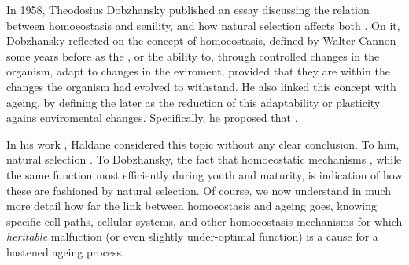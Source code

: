 
In 1958, Theodosius Dobzhansky published an essay discussing the relation between homoeostasis and senility, and how natural selection affects both \cite{Dobzhansky1958}.
On it, Dobzhansky reflected on the concept of homoeostasis, defined by Walter Cannon some years before as the  \cite{Cannon1934}, or the ability to, through controlled changes in the organism, adapt to changes in the eviroment, provided that they are within the  changes the organism had evolved to withstand.
He also linked this concept with ageing, by defining the later as the reduction of this adaptability or plasticity agains  enviromental changes.
Specifically, he proposed that .

In his work , Haldane considered this topic without any clear conclusion.
To him, natural selection  \cite{Haldane1933}.
To Dobzhansky, the fact that homoeostatic mechanisms , while the same function most efficiently during youth and maturity, is indication of how these are fashioned by natural selection.
Of course, we now understand in much more detail how far the link between homoeostasis and ageing goes, knowing specific cell paths, cellular systems, and other homoeostasis mechanisms for which \emph{heritable} malfuction (or even slightly under-optimal function) is a cause for a hastened ageing process.

